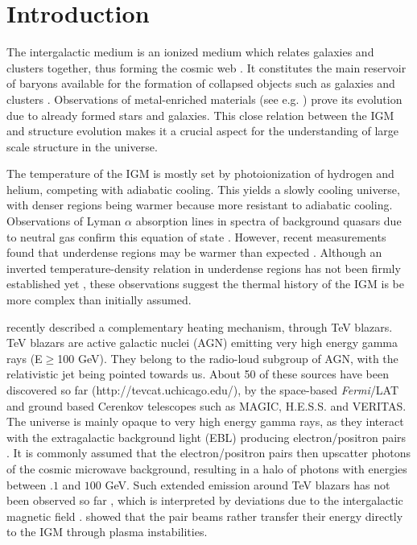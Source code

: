 \documentclass[twocolumns]{emulateapj}
\begin{document}
\section{Introduction}
The intergalactic medium is an ionized medium which relates galaxies and clusters together, thus forming the cosmic web \citep{1996Natur.380..603B}. It constitutes the main reservoir of baryons available for the formation of collapsed objects such as galaxies and clusters \citep{1997ApJ...489....7R}. Observations of metal-enriched materials (see e.g. \citet{2009A&A...493..409S,2010MNRAS.407.2063W}) prove its evolution due to already formed stars and galaxies. This close relation between the IGM and structure evolution makes it a  crucial aspect for the understanding of large scale structure in the universe.

The temperature of the IGM is mostly set by photoionization of hydrogen  and helium, competing with adiabatic cooling. This yields a slowly cooling universe, with denser regions being warmer because more resistant to adiabatic cooling. Observations of Lyman $\alpha$ absorption lines in spectra of background quasars due to neutral gas confirm this equation of state \citep{2000MNRAS.318..817S,2000ApJ...534...41R,2012ApJ...757L..30R}. However, recent measurements found that underdense regions may be warmer than expected \citep{2009MNRAS.399L..39V,2008MNRAS.386.1131B,2014MNRAS.441.1916B}. Although an inverted temperature-density relation in underdense regions has not been firmly established yet \citep{2014MNRAS.438.2499B}, these observations suggest the thermal history of the IGM is be more complex than initially assumed.



\citet{2012ApJ...752...22B} recently described a complementary heating mechanism, through TeV blazars. TeV blazars are active galactic nuclei (AGN) emitting  very high energy gamma rays (E$\ge$100 GeV). They belong to the radio-loud subgroup of AGN, with the relativistic jet being pointed towards us.  About 50 of these sources have been discovered so far (http://tevcat.uchicago.edu/), by the space-based \textit{Fermi}/LAT and ground based Cerenkov telescopes such as MAGIC, H.E.S.S. and VERITAS. The universe is mainly opaque to  very high energy  gamma rays, as they interact with the extragalactic background light (EBL) producing electron/positron pairs \citep{1967PhRv..155.1408G,1992ApJ...390L..49S}.  It is commonly assumed that the electron/positron pairs then upscatter photons of the cosmic microwave background, resulting in  a halo of photons with energies between $.1$ and $100$ GeV. Such extended emission around TeV blazars has not been observed so far \citep{2010A&A...524A..77A,2014A&A...562A.145H}, which is interpreted by deviations due to the intergalactic magnetic field \citep{2013A&ARv..21...62D,2012ApJ...747L..14V,2011ApJ...733L..21D}. \citet{2012ApJ...752...22B} showed that the pair beams rather transfer their energy directly to the IGM through plasma instabilities.
\end{document}
